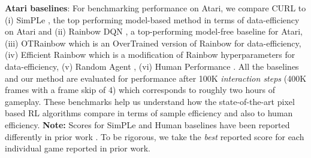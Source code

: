 \textbf{Atari baselines}: For benchmarking performance on Atari, we compare CURL to (i) SimPLe \cite{kaiser2019model}, the top performing model-based method in terms of data-efficiency on Atari and (ii) Rainbow DQN \cite{hessel2017rainbow}, a top-performing model-free baseline for Atari, (iii) OTRainbow \cite{kielak2020rainbow} which is an OverTrained version of Rainbow for data-efficiency, (iv) Efficient Rainbow \cite{van2019use} which is a modification of Rainbow hyperparameters for data-efficiency, (v) Random Agent \cite{kaiser2019model}, (vi) Human Performance \cite{kaiser2019model, van2019use}. All the baselines and our method are evaluated for performance after 100K {\it interaction steps} (400K frames with a frame skip of 4) which corresponds to roughly two hours of gameplay. These benchmarks help us understand how the state-of-the-art pixel based RL algorithms compare in terms of sample efficiency and also to human efficiency. {\textbf{Note:}} Scores for SimPLe and Human baselines have been reported differently in prior work \cite{kielak2020rainbow, van2019use}. To be rigorous, we take the {\it best} reported score for each individual game reported in prior work. 

